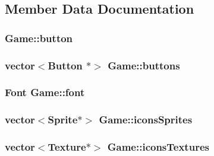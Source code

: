 \subsection{Member Data Documentation}
\subsubsection[{\texorpdfstring{button}{button}}]{ Game\+::button\hspace{0.3cm}{\ttfamily [private]}}\hypertarget{class_game_a16e92942e7362adb169b98e56e59aa0e}{}\label{class_game_a16e92942e7362adb169b98e56e59aa0e}
\subsubsection[{\texorpdfstring{buttons}{buttons}}]{\setlength{\rightskip}{0pt plus 5cm}vector$<${\bf Button} $\ast$$>$ Game\+::buttons\hspace{0.3cm}{\ttfamily [private]}}\hypertarget{class_game_ae699e93a493eb14c7009054c5ddab8d7}{}\label{class_game_ae699e93a493eb14c7009054c5ddab8d7}
\subsubsection[{\texorpdfstring{font}{font}}]{\setlength{\rightskip}{0pt plus 5cm}Font Game\+::font\hspace{0.3cm}{\ttfamily [private]}}\hypertarget{class_game_aa9c5aff719d0bde89121da263e9c1b1c}{}\label{class_game_aa9c5aff719d0bde89121da263e9c1b1c}
\subsubsection[{\texorpdfstring{icons\+Sprites}{iconsSprites}}]{\setlength{\rightskip}{0pt plus 5cm}vector$<$Sprite$\ast$$>$ Game\+::icons\+Sprites\hspace{0.3cm}{\ttfamily [private]}}\hypertarget{class_game_a4f4ef83dc173252517c1e91667bd6239}{}\label{class_game_a4f4ef83dc173252517c1e91667bd6239}
\subsubsection[{\texorpdfstring{icons\+Textures}{iconsTextures}}]{\setlength{\rightskip}{0pt plus 5cm}vector$<$Texture$\ast$$>$ Game\+::icons\+Textures\hspace{0.3cm}{\ttfamily [private]}}\hypertarget{class_game_a40e4eab46df384695bc73ff0f36b171f}{}\label{class_game_a40e4eab46df384695bc73ff0f36b171f}
